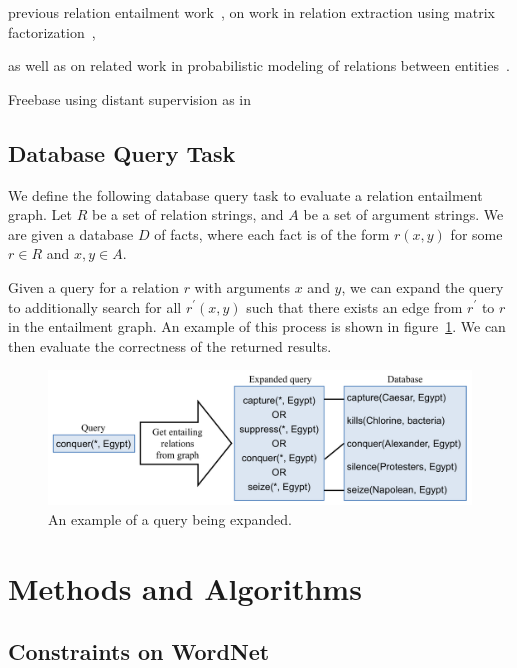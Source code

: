 \documentclass{article}
\begin{document}
previous relation entailment
work~\cite{Berant:2012:LER:2122944.2122947, berant2011global}, on work in relation
extraction using matrix factorization~\cite{riedel13relation}, 

as well as on related work in probabilistic modeling of relations
between entities~\cite{TaskarWAK03, Taskar:2002:DPM:2073876.2073934}.

Freebase using distant supervision as in~\cite{HoffmannZLZW11}

\subsection{Database Query Task}
\label{database-query-task}
We define the following database query task to evaluate a relation entailment graph. Let $R$ be a set of relation strings, and $A$ be a set of argument strings. We are given a database $D$ of facts, where each fact is of the form $r(x, y)$ for some $r\in R$ and $x, y\in A$.

Given a query for a relation $r$ with arguments $x$ and $y$, we can expand the query to additionally search for all $r^\prime(x, y)$ such that there exists an edge from $r^\prime$ to $r$ in the entailment graph. An example of this process is shown in figure~\ref{query-expansion}. We can then evaluate the correctness of the returned results.

\begin{figure}[h]
\begin{center}
\includegraphics[width=1.0\textwidth]{figures/query-expansion.pdf}
\end{center}
\caption{An example of a query being expanded.}\label{query-expansion}
\end{figure}

\section{Methods and Algorithms}

\subsection{Constraints on WordNet}
\end{document}
